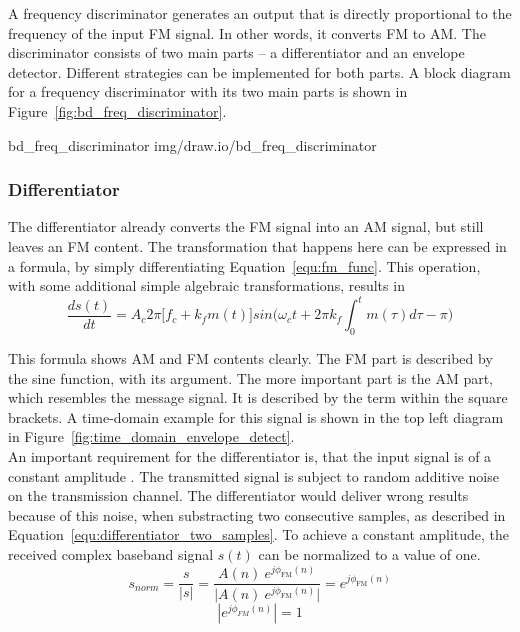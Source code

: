 A frequency discriminator generates an output that is directly proportional to the frequency of the input FM signal.
In other words, it converts FM to AM.
The discriminator consists of two main parts -- a differentiator and an envelope detector.
Different strategies can be implemented for both parts.
A block diagram for a frequency discriminator with its two main parts is shown in Figure~\ref{fig:bd_freq_discriminator}.

 {bd_freq_discriminator} {img/draw.io/bd_freq_discriminator}

\subsubsection{Differentiator}

The differentiator already converts the FM signal into an AM signal, but still leaves an FM content.
The transformation that happens here can be expressed in a formula, by simply differentiating Equation~\eqref{equ:fm_func}.
This operation, with some additional simple algebraic transformations, results in
\begin{equation}
  \frac{d s(t)}{dt} = A_c 2 \pi \Big[f_c + k_f m(t) \Big] sin \Big(\omega_c t + 2 \pi k_f \int_{0}^{t} m(\tau) d\tau - \pi \Big)
  \label{equ:fm_demod_discriminator}
\end{equation}

This formula shows AM and FM contents clearly.
The FM part is described by the sine function, with its argument.
The more important part is the AM part, which resembles the message signal.
It is described by the term within the square brackets.
A time-domain example for this signal is shown in the top left diagram in Figure~\ref{fig:time_domain_envelope_detect}.\\

An important requirement for the differentiator is, that the input signal is of a constant amplitude \cite{SchnyderHaller2002}.
The transmitted signal is subject to random additive noise on the transmission channel.
The differentiator would deliver wrong results because of this noise, when substracting two consecutive samples, as described in Equation~\eqref{equ:differentiator_two_samples}.
To achieve a constant amplitude, the received complex baseband signal $s(t)$ can be normalized to a value of one.
\begin{equation}
  s_{norm} = \frac{s}{|s|} = \frac{A(n)\ e^{j\phi_{\text{FM}}(n)}}{|{A(n)\ e^{j\phi_{\text{FM}}(n)}|}} = e^{j\phi_{\text{FM}}(n)}
\end{equation}
\begin{equation}
  |e^{j\phi_{FM}(n)}| = 1
\end{equation}

